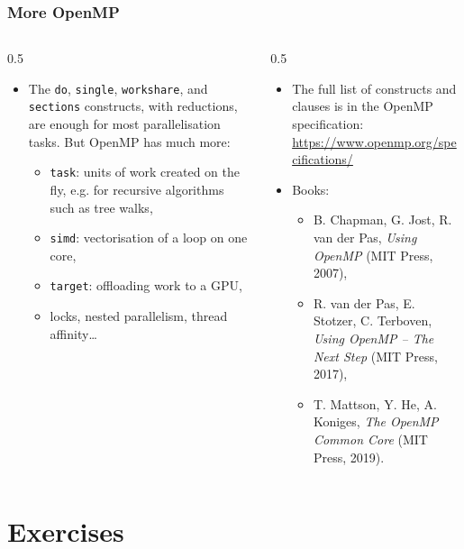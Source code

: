 \begin{frame}
  \frametitle{More OpenMP}
  \begin{columns}[T]
    \begin{column}{0.5\textwidth}
      \begin{itemize}
        \item The \texttt{do}, \texttt{single}, \texttt{workshare}, and \texttt{sections} constructs, with reductions, are enough for most parallelisation tasks. But OpenMP has much more:
          \begin{itemize}
            \item \texttt{task}: units of work created on the fly, e.g. for recursive algorithms such as tree walks,
            \item \texttt{simd}: vectorisation of a loop on one core,
            \item \texttt{target}: offloading work to a GPU,
            \item locks, nested parallelism, thread affinity\ldots
          \end{itemize}
      \end{itemize}
    \end{column}

    \begin{column}{0.5\textwidth}
      \begin{itemize}
        \item The full list of constructs and clauses is in the OpenMP specification: \url{https://www.openmp.org/specifications/}
        \item Books:
          \begin{itemize}
            \item B. Chapman, G. Jost, R. van der Pas, \emph{Using OpenMP} (MIT Press, 2007),
            \item R. van der Pas, E. Stotzer, C. Terboven, \emph{Using OpenMP -- The Next Step} (MIT Press, 2017),
            \item T. Mattson, Y. He, A. Koniges, \emph{The OpenMP Common Core} (MIT Press, 2019).
          \end{itemize}
      \end{itemize}
    \end{column}
  \end{columns}
\end{frame}


\section{Exercises}

